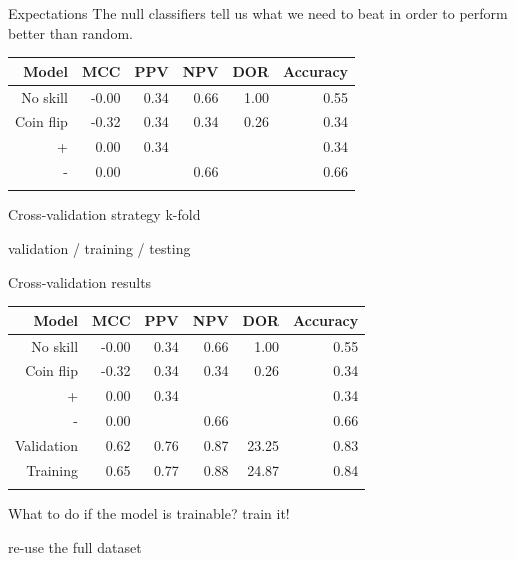 \documentclass[12pt, smalloffset, compress, aspectratio=1610]{beamer}
\begin{document}
\begin{frame}{Expectations}
\label{expectations}
The null classifiers tell us what we need to beat in order to perform
\alert{better than
random}.

\begin{longtable}[]{@{}rrrrrr@{}}
\toprule\noalign{}
\textbf{Model} & \textbf{MCC} & \textbf{PPV} & \textbf{NPV} &
\textbf{DOR} & \textbf{Accuracy} \\
\midrule\noalign{}
\endhead
No skill & -0.00 & 0.34 & 0.66 & 1.00 & 0.55 \\
Coin flip & -0.32 & 0.34 & 0.34 & 0.26 & 0.34 \\
+ & 0.00 & 0.34 & & & 0.34 \\
- & 0.00 & & 0.66 & & 0.66 \\
\bottomrule\noalign{}
\end{longtable}
\end{frame}

\begin{frame}{Cross-validation strategy}
\label{cross-validation-strategy}
k-fold

validation / training / testing
\end{frame}

\begin{frame}{Cross-validation results}
\label{cross-validation-results}
\begin{longtable}[]{@{}rrrrrr@{}}
\toprule\noalign{}
\textbf{Model} & \textbf{MCC} & \textbf{PPV} & \textbf{NPV} &
\textbf{DOR} & \textbf{Accuracy} \\
\midrule\noalign{}
\endhead
No skill & -0.00 & 0.34 & 0.66 & 1.00 & 0.55 \\
Coin flip & -0.32 & 0.34 & 0.34 & 0.26 & 0.34 \\
+ & 0.00 & 0.34 & & & 0.34 \\
- & 0.00 & & 0.66 & & 0.66 \\
Validation & 0.62 & 0.76 & 0.87 & 23.25 & 0.83 \\
Training & 0.65 & 0.77 & 0.88 & 24.87 & 0.84 \\
\bottomrule\noalign{}
\end{longtable}
\end{frame}

\begin{frame}{What to do if the model is trainable?}
\label{what-to-do-if-the-model-is-trainable}
train it!

re-use the full dataset
\end{frame}
\end{document}

